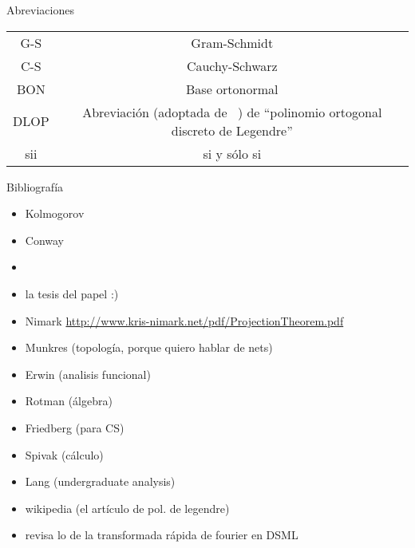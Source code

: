 \begin{center}
\huge{Abreviaciones}
\end{center}

\vspace{0.5cm}

\begin{tabular}{ c c }
 G-S & Gram-Schmidt \\
 C-S & Cauchy-Schwarz \\
 BON & Base ortonormal \\
 DLOP & Abreviación (adoptada de ~\cite{Neuman})
 de ``polinomio ortogonal discreto de Legendre'' \\
 sii & si y sólo si 
\end{tabular}


\begin{center}
\huge{Bibliografía}
\end{center}
\begin{itemize}
\item Kolmogorov
\item Conway
\item {}
\item la tesis del papel :)
\item Nimark
\url{http://www.kris-nimark.net/pdf/ProjectionTheorem.pdf}
\item Munkres (topología, porque quiero hablar de nets)
\item Erwin (analisis funcional)
\item Rotman (álgebra)
\item Friedberg (para CS)
\item Spivak (cálculo)
\item Lang (undergraduate analysis)
\item wikipedia (el artículo de pol. de legendre)
\item revisa lo de la transformada rápida de fourier en DSML
\end{itemize}











\newpage